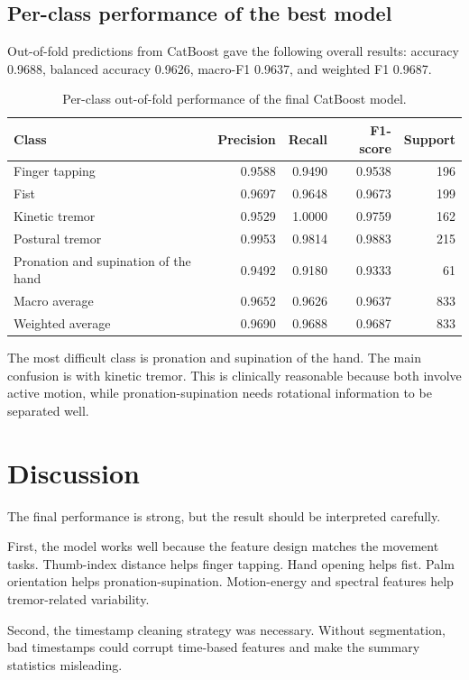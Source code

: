 \documentclass[10pt,twocolumn]{article}
\begin{document}
\subsection{Per-class performance of the best model}
Out-of-fold predictions from CatBoost gave the following overall results: accuracy 0.9688, balanced accuracy 0.9626, macro-F1 0.9637, and weighted F1 0.9687.

\begin{table}[t]
\centering
\caption{Per-class out-of-fold performance of the final CatBoost model.}
\label{tab:per-class-short}
\begin{tabular}{lrrrr}
\toprule
Class & Precision & Recall & F1-score & Support \\
\midrule
Finger tapping & 0.9588 & 0.9490 & 0.9538 & 196 \\
Fist & 0.9697 & 0.9648 & 0.9673 & 199 \\
Kinetic tremor & 0.9529 & 1.0000 & 0.9759 & 162 \\
Postural tremor & 0.9953 & 0.9814 & 0.9883 & 215 \\
Pronation and supination of the hand & 0.9492 & 0.9180 & 0.9333 & 61 \\
\midrule
Macro average & 0.9652 & 0.9626 & 0.9637 & 833 \\
Weighted average & 0.9690 & 0.9688 & 0.9687 & 833 \\
\bottomrule
\end{tabular}
\end{table}

The most difficult class is pronation and supination of the hand. The main confusion is with kinetic tremor. This is clinically reasonable because both involve active motion, while pronation-supination needs rotational information to be separated well.

\section{Discussion}
The final performance is strong, but the result should be interpreted carefully.

First, the model works well because the feature design matches the movement tasks. Thumb-index distance helps finger tapping. Hand opening helps fist. Palm orientation helps pronation-supination. Motion-energy and spectral features help tremor-related variability.

Second, the timestamp cleaning strategy was necessary. Without segmentation, bad timestamps could corrupt time-based features and make the summary statistics misleading.
\end{document}

